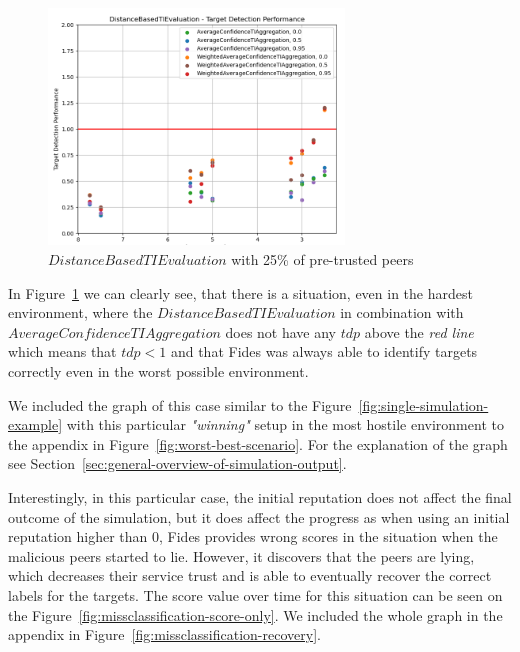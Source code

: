 \begin{figure}[ht]
    \centering
    \includegraphics[width=0.7\textwidth]{assets/25_distance_detection_detail.png}
    \caption{$DistanceBasedTIEvaluation$ with 25\% of pre-trusted peers}
    \label{fig:distance-detection-detail-25}
\end{figure}

In Figure~\ref{fig:distance-detection-detail-25} we can clearly see, that there is a situation, even in the hardest environment, where the $DistanceBasedTIEvaluation$ in combination with $AverageConfidenceTIAggregation$ does not have any $tdp$ above the \textit{red line} which means that $tdp < 1$ and that Fides was always able to identify targets correctly even in the worst possible environment.

We included the graph of this case similar to the Figure~\ref{fig:single-simulation-example} with this particular \textit{"winning"} setup in the most hostile environment to the appendix in Figure~\ref{fig:worst-best-scenario}. For the explanation of the graph see Section~\ref{sec:general-overview-of-simulation-output}.

Interestingly, in this particular case, the initial reputation does not affect the final outcome of the simulation, but it does affect the progress as when using an initial reputation higher than $0$, Fides provides wrong scores in the situation when the malicious peers started to lie.
However, it discovers that the peers are lying, which decreases their service trust and is able to eventually recover the correct labels for the targets.
The score value over time for this situation can be seen on the Figure~\ref{fig:missclassification-score-only}.
We included the whole graph in the appendix in Figure~\ref{fig:missclassification-recovery}.

